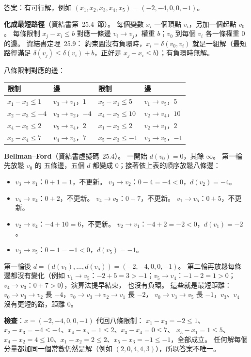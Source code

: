 \begin{pastsoln}
答案：有可行解，例如 $(x_1, x_2, x_3, x_4, x_5) = (-2, -4, 0, 0, -1)$。

\textbf{化成最短路徑}（資結書第~25.4~節）。 每個變數 $x_i$ 一個頂點 $v_i$，另加一個起點 $v_0$。 每條限制
$x_j - x_i \le b$ 對應一條邊 $v_i \to v_j$，權重 $b$；$v_0$ 到每個 $v_i$ 各一條權重 $0$ 的邊。 資結書定理~25.9：
約束圖沒有負環時，$x_i = \delta(v_0, v_i)$ 就是一組解（最短路徑滿足 $\delta(v_j) \le \delta(v_i) + b$，正好是
$x_j - x_i \le b$）；有負環時無解。

八條限制對應的邊：
\begin{center}
\small
\begin{tabular}{llll}
\toprule
限制 & 邊 & 限制 & 邊 \\
\midrule
$x_1 - x_3 \le 1$ & $v_3 \to v_1$，$1$ & $x_5 - x_1 \le 5$ & $v_1 \to v_5$，$5$ \\
$x_2 - x_3 \le -4$ & $v_3 \to v_2$，$-4$ & $x_4 - x_2 \le 10$ & $v_2 \to v_4$，$10$ \\
$x_4 - x_5 \le 2$ & $v_5 \to v_4$，$2$ & $x_1 - x_2 \le 2$ & $v_2 \to v_1$，$2$ \\
$x_3 - x_4 \le 7$ & $v_4 \to v_3$，$7$ & $x_5 - x_3 \le -1$ & $v_3 \to v_5$，$-1$ \\
\bottomrule
\end{tabular}
\end{center}

\textbf{Bellman--Ford}（資結書虛擬碼~25.4）。 一開始 $d(v_0) = 0$，其餘 $\infty$。 第一輪先放鬆 $v_0$ 的
五條邊，五個 $d$ 都變成 $0$；接著依上表的順序放鬆八條邊：
\begin{itemize}
\item $v_3 \to v_1$：$0 + 1 = 1$，不更新。 $v_3 \to v_2$：$0 - 4 = -4 < 0$，$d(v_2) = -4$。
\item $v_5 \to v_4$：$0 + 2$，不更新。 $v_4 \to v_3$：$0 + 7$，不更新。 $v_1 \to v_5$：$0 + 5$，不更新。
\item $v_2 \to v_4$：$-4 + 10 = 6$，不更新。 $v_2 \to v_1$：$-4 + 2 = -2 < 0$，$d(v_1) = -2$。
\item $v_3 \to v_5$：$0 - 1 = -1 < 0$，$d(v_5) = -1$。
\end{itemize}
第一輪後 $d = (d(v_1), \ldots, d(v_5)) = (-2, -4, 0, 0, -1)$。 第二輪再放鬆每條邊都沒有變化（例如
$v_1 \to v_5$：$-2 + 5 = 3 > -1$；$v_5 \to v_4$：$-1 + 2 = 1 > 0$；$v_4 \to v_3$：$0 + 7 > 0$），演算法提早結束，
也沒有負環。 這些就是最短距離：$v_0 \to v_3 \to v_2$ 長 $-4$，$v_0 \to v_3 \to v_2 \to v_1$ 長 $-2$，
$v_0 \to v_3 \to v_5$ 長 $-1$，$v_3$、$v_4$ 沒有更短的路，距離 $0$。

\textbf{檢查}：$x = (-2, -4, 0, 0, -1)$ 代回八條限制：
$x_1 - x_3 = -2 \le 1$、$x_2 - x_3 = -4 \le -4$、$x_4 - x_5 = 1 \le 2$、$x_3 - x_4 = 0 \le 7$、
$x_5 - x_1 = 1 \le 5$、$x_4 - x_2 = 4 \le 10$、$x_1 - x_2 = 2 \le 2$、$x_5 - x_3 = -1 \le -1$，全部成立。
任何解每個分量都加同一個常數仍然是解（例如 $(2, 0, 4, 4, 3)$），所以答案不唯一。
\end{pastsoln}
